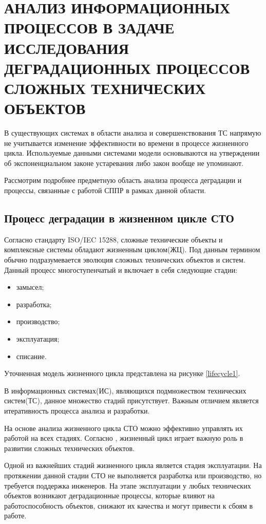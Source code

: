 \section{АНАЛИЗ ИНФОРМАЦИОННЫХ ПРОЦЕССОВ В ЗАДАЧЕ ИССЛЕДОВАНИЯ ДЕГРАДАЦИОННЫХ ПРОЦЕССОВ СЛОЖНЫХ ТЕХНИЧЕСКИХ ОБЪЕКТОВ}
 
В существующих системах в области анализа и совершенствования ТС напрямую не учитывается изменение эффективности во времени в процессе жизненного цикла. 
Используемые данными системами модели основываются на утверждении об экспоненциальном законе устаревания либо закон вообще не упоминают. 

Рассмотрим подробнее предметную область анализа процесса деградации и процессы, связанные с работой СППР в рамках данной области.

\subsection{Процесс деградации в жизненном цикле СТО}
Согласно стандарту ISO/IEC 15288, сложные технические объекты и комплексные системы обладают жизненным циклом(ЖЦ).
Под данным термином обычно подразумевается эволюция сложных технических объектов и систем.
Данный процесс многоступенчатый и включает в себя следующие стадии:
\begin{itemize}
    \item замысел;
    \item разработка;
    \item производство;
    \item эксплуатация;
    \item списание.
\end{itemize}
Уточненная модель жизненного цикла представлена на рисунке \ref{lifecycle1}.


В информационных системах(ИС), являющихся подмножеством технических систем(ТС), данное множество стадий присутствует.
Важным отличием является итеративность процесса анализа и разработки.

На основе анализа жизненного цикла СТО можно эффективно управлять их работой на всех стадиях.
Согласно \cite{Doronina}, жизненный цикл играет важную роль в развитии сложных технических объектов.

Одной из важнейших стадий жизненного цикла является стадия эксплуатации.
На протяжении данной стадии СТО не выполняется разработка или производство,
но требуется поддержка инженеров. 
На этапе эксплуатации у любых технических объектов возникают деградационные процессы, которые влияют на работоспособность объектов, снижают их качества и могут привести к сбоям в работе.

